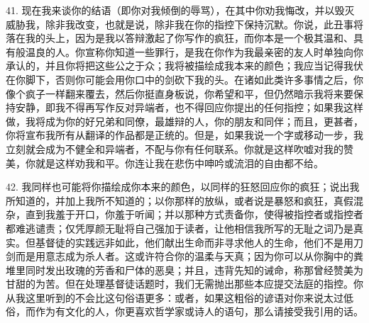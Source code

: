 41. 现在我来谈你的结语（即你对我倾倒的辱骂），在其中你劝我悔改，并以毁灭威胁我，除非我改变，也就是说，除非我在你的指控下保持沉默。你说，此丑事将落在我的头上，因为是我以答辩激起了你写作的疯狂，而你本是一个极其温和、具有般温良的人。你宣称你知道一些罪行，是我在你作为我最亲密的友人时单独向你承认的，并且你将把这些公之于众；我将被描绘成我本来的颜色；我应当记得我伏在你脚下，否则你可能会用你口中的剑砍下我的头。在诸如此类许多事情之后，你像个疯子一样翻来覆去，然后你挺直身板说，你希望和平，但仍然暗示我将来要保持安静，即我不得再写作反对异端者，也不得回应你提出的任何指控；如果我这样做，我将成为你的好兄弟和同僚，最雄辩的人，你的朋友和同伴；而且，更甚者，你将宣布我所有从翻译的作品都是正统的。但是，如果我说一个字或移动一步，我立刻就会成为不健全和异端者，不配与你有任何联系。你就是这样吹嘘对我的赞美，你就是这样劝我和平。你连让我在悲伤中呻吟或流泪的自由都不给。\par

42. 我同样也可能将你描绘成你本来的颜色，以同样的狂怒回应你的疯狂；说出我所知道的，并加上我所不知道的；以你那样的放纵，或者说是暴怒和疯狂，真假混杂，直到我羞于开口，你羞于听闻；并以那种方式责备你，使得被指控者或指控者都难逃谴责；仅凭厚颜无耻将自己强加于读者，让他相信我所写的无耻之词乃是真实。但基督徒的实践远非如此，他们献出生命而非寻求他人的生命，他们不是用刀剑而是用意志成为杀人者。这或许符合你的温柔与天真；因为你可以从你胸中的粪堆里同时发出玫瑰的芳香和尸体的恶臭；并且，违背先知的诫命，称那曾经赞美为甘甜的为苦。但在处理基督徒话题时，我们无需抛出那些本应提交法庭的指控。你从我这里听到的不会比这句俗语更多：或者，如果这粗俗的谚语对你来说太过低俗，而作为有文化的人，你更喜欢哲学家或诗人的语句，那么请接受我引用的话。\par

\par

